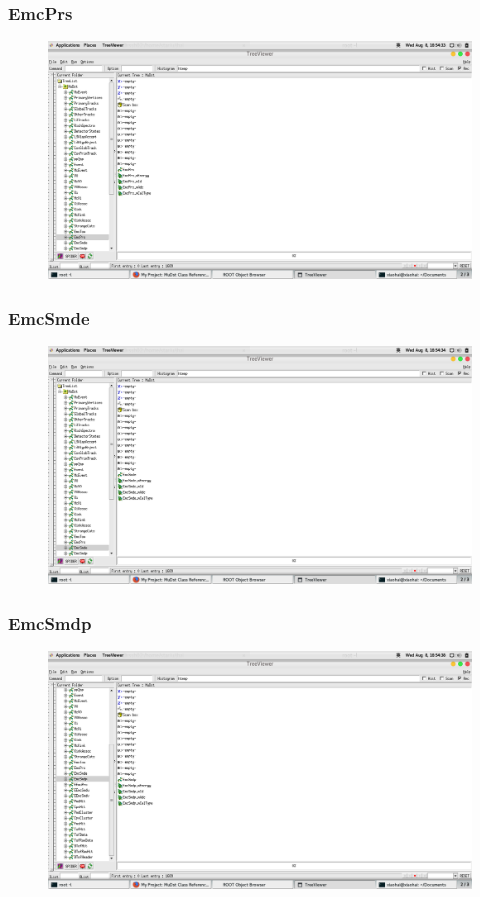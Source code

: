 \documentclass[10pt]{beamer}
\begin{document}
\label{EmcPrs}
\begin{frame}
  \frametitle{EmcPrs}
  \begin{figure}[hbtp]
    \centering
    \includegraphics[width=\textwidth]{EmcPrs.png}
  \end{figure}
\end{frame}
\label{EmcSmde}
\begin{frame}
  \frametitle{EmcSmde}
  \begin{figure}[hbtp]
    \centering
    \includegraphics[width=\textwidth]{EmcSmde.png}
  \end{figure}
\end{frame}
\label{EmcSmdp}
\begin{frame}
  \frametitle{EmcSmdp}
  \begin{figure}[hbtp]
    \centering
    \includegraphics[width=\textwidth]{EmcSmdp.png}
  \end{figure}
\end{frame}
\end{document}
